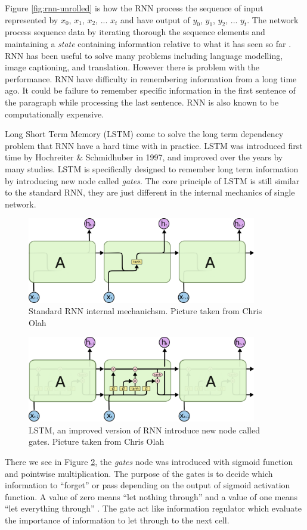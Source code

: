 Figure \ref{fig:rnn-unrolled} is how the RNN process the sequence of input represented by $x_0$, $x_1$, $x_2$, ... $x_t$ and have output of $y_0$, $y_1$, $y_2$, ... $y_t$. The network process sequence data by iterating thorough the sequence elements and maintaining a \emph{state} containing information relative to what it has seen so far \cite{franoischollet2017learning}. RNN has been useful to solve many problems including language modelling, image captioning, and translation. However there is problem with the performance. RNN have difficulty in remembering information from a long time ago. It could be failure to remember specific information in the first sentence of the paragraph while processing the last sentence. RNN is also known to be computationally expensive.

Long Short Term Memory (LSTM) come to solve the long term dependency problem that RNN have a hard time with in practice. LSTM was introduced first time by Hochreiter \& Schmidhuber in 1997, and improved over the years by many studies. LSTM is specifically designed to remember long term information by introducing new node called \emph{gates}. The core principle of LSTM is still similar to the standard RNN, they are just different in the internal mechanics of single network. 

\begin{figure}[t!]
    \centering
    \includegraphics[width=10cm]{pic/ch-review/LSTM3-SimpleRNN.png}
    \caption{Standard RNN internal mechanichsm. Picture taken from Chris Olah}
    \label{fig:rnn}
\end{figure}

\begin{figure}[t!]
    \centering
    \includegraphics[width=10cm]{pic/ch-review/LSTM3-chain.png}
    \caption{LSTM, an improved version of RNN introduce new node called gates. Picture taken from Chris Olah}
    \label{fig:lstm}
\end{figure}

There we see in Figure \ref{fig:lstm}, the \emph{gates} node was introduced with sigmoid function and pointwise multiplication. The purpose of the gates is to decide which information to ``forget'' or pass depending on the output of sigmoid activation function. A value of zero means ``let nothing through'' and a value of one means ``let everything through'' \cite{lstmcolah}. The gate act like information regulator which evaluate the importance of information to let through to the next cell.